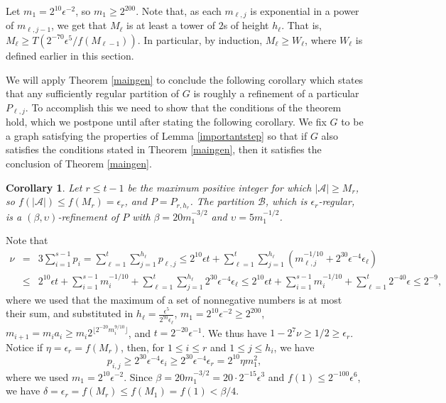 \documentclass[11pt]{article}
\newtheorem{corollary}{Corollary}[section]
\begin{document}
Let $m_1=2^{10}\epsilon^{-2}$, so $m_1 \geq 2^{200}$.  Note that, as each
$m_{\ell,j}$ is exponential in a power of $m_{\ell,j-1}$, we get that
$M_{\ell}$ is at least a tower of $2$s of height $h_{\ell}$. That is, $M_{\ell}
\geq T\left(2^{-70}\epsilon^{5}/f(M_{\ell-1})\right)$. In particular, by
induction, $M_{\ell} \geq W_{\ell}$, where $W_{\ell}$ is defined earlier in
this section.

We will apply Theorem \ref{maingen} to conclude the following corollary which
states that any sufficiently regular partition of $G$ is roughly a refinement
of a particular $P_{\ell,j}$. To accomplish this we need to show that the
conditions of the theorem hold, which we postpone until after stating the
following corollary. We fix $G$ to be a graph satisfying the properties of
Lemma \ref{importantstep} so that if $G$ also satisfies the conditions stated
in Theorem \ref{maingen}, then it satisfies the conclusion of Theorem
\ref{maingen}.

\begin{corollary}\label{corforstr}
Let $r \leq t-1$ be the maximum positive integer for which $|\mathcal{A}| \geq M_{r}$, so $f(|\mathcal{A}|) \leq f(M_r) = \epsilon_r$, and $P=P_{r,h_{r}}$. The partition $\mathcal{B}$, which is $\epsilon_{r}$-regular, is a
$(\beta,\upsilon)$-refinement of $P$ with $\beta=20m_1^{-3/2}$ and
$\upsilon=5m_1^{-1/2}$.
\end{corollary}

 Note that
\begin{eqnarray*}
\nu & = & 3\sum_{i=1}^{s-1} p_i=\sum_{\ell=1}^{t}\sum_{j=1}^{h_{\ell}}
p_{\ell,j}\leq
2^{10}\epsilon t+\sum_{\ell=1}^{t} \sum_{j=1}^{h_{\ell}}
\left(m_{\ell,j}^{-1/10}+2^{30}\epsilon^{-4}\epsilon_{\ell}\right)
\\ & \leq &  2^{10}\epsilon t+\sum_{i=1}^{s-1} m_i^{-1/10}+\sum_{\ell=1}^{t}
\sum_{j=1}^{h_{\ell}} 2^{30}\epsilon^{-4}\epsilon_{\ell} \leq  2^{10}\epsilon
t+\sum_{i=1}^{s-1} m_i^{-1/10}+\sum_{\ell=1}^{t}2^{-40}\epsilon \leq
2^{-9},
\end{eqnarray*}
where we used that the maximum of a set of nonnegative numbers is at most their sum, and substituted in $h_{\ell}=\frac{\epsilon^{5}}{2^{70}\epsilon_{\ell}}$,
$m_1 = 2^{10}\epsilon^{-2} \geq 2^{200}$, $m_{i+1} =m_ia_i \geq
m_i2^{\lfloor 2^{-20} m_i^{9/10} \rfloor}$, and $t=2^{-20}\epsilon^{-1}$.  We thus have $1-2^7\nu
\geq 1/2 \geq \epsilon_r$. Notice if $\eta=\epsilon_{r}=f(M_{r})$, then, for $1 \leq i
\leq r$ and $1 \leq j \leq h_i$, we have $$p_{i,j} \geq
2^{30}\epsilon^{-4}\epsilon_{i}
\geq 2^{30}\epsilon^{-4}\epsilon_{r} = 2^{10}\eta m_1^2,$$
where we used $m_1=2^{10}\epsilon^{-2}$. Since $\beta=20m_1^{-3/2} = 20 \cdot 2^{-15}\epsilon^3$ and
 $f(1) \leq 2^{-100}\epsilon^6$, we have $\delta = \epsilon_{r}=f(M_{r}) \leq
f(M_1)=f(1)<\beta/4$.
\end{document}
